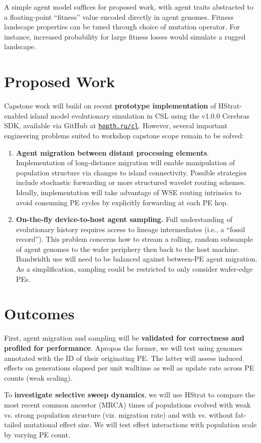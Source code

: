 A simple agent model suffices for proposed work, with agent traits abstracted to a floating-point ``fitness'' value encoded directly in agent genomes.
Fitness landscape properties can be tuned through choice of mutation operator.
For instance, increased probability for large fitness losses would simulate a rugged landscape.

\section{Proposed Work}

Capstone work will build on recent \textbf{prototype implementation} of HStrat-enabled island model evolutionary simulation in CSL using the v1.0.0 Cerebras SDK, available via GitHub at \texttt{\href{https://hopth.ru/cl}{hopth.ru/cl}}.
However, several important engineering problems suited to workshop capstone scope remain to be solved:
\begin{enumerate}[leftmargin=*]
\item \textbf{Agent migration between distant processing elements}.
Implementation of long-distance migration will enable manipulation of population structure via changes to island connectivity.
Possible strategies include stochastic forwarding or more structured wavelet routing schemes.
Ideally, implementation will take advantage of WSE routing intrinsics to avoid consuming PE cycles by explicitly forwarding at each PE hop.

\item \textbf{On-the-fly device-to-host agent sampling.}
Full understanding of evolutionary history requires access to lineage intermediates (i.e., a ``fossil record'').
This problem concerns how to stream a rolling, random subsample of agent genomes to the wafer periphery then back to the host machine.
Bandwidth use will need to be balanced against between-PE agent migration.
As a simplification, sampling could be restricted to only consider wafer-edge PEs.
\end{enumerate}

\section{Outcomes}

First, agent migration and sampling will be \textbf{validated for correctness and profiled for performance}.
Apropos the former, we will test using genomes annotated with the ID of their originating PE.
The latter will assess induced effects on generations elapsed per unit walltime as well as update rate across PE counts (weak scaling).

To \textbf{investigate selective sweep dynamics}, we will use HStrat to compare the most recent common ancestor (MRCA) times of populations evolved with weak vs. strong population structure (viz. migration rate) and with vs. without fat-tailed mutational effect size.
We will test effect interactions with population scale by varying PE count.
